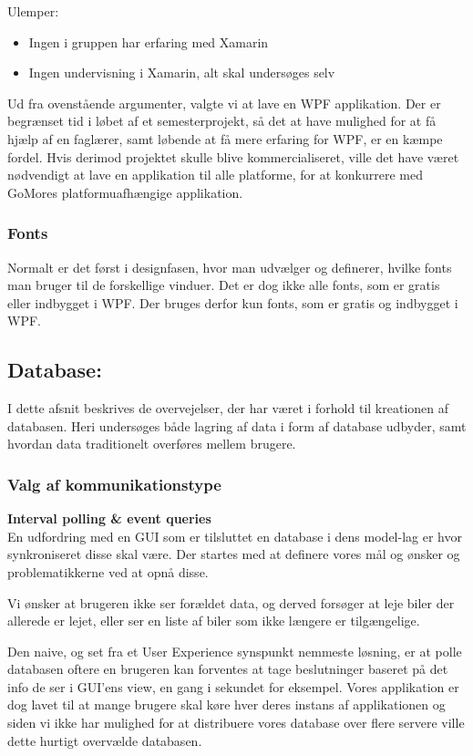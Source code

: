\documentclass[a4paper,12pt,fleqn,oneside]{article}
\begin{document}
Ulemper: \\
\begin{itemize}
    \item Ingen i gruppen har erfaring med Xamarin 
    \item Ingen undervisning i Xamarin, alt skal undersøges selv
\end{itemize}
Ud fra ovenstående argumenter, valgte vi at lave en WPF applikation. Der er begrænset tid i løbet af et semesterprojekt, så det at have mulighed for at få hjælp af en faglærer, samt løbende at få mere erfaring for WPF, er en kæmpe fordel. Hvis derimod projektet skulle blive kommercialiseret, ville det have været nødvendigt at lave en applikation til alle platforme, for at konkurrere med GoMores platformuafhængige applikation. 

\subsubsection{Fonts}
Normalt er det først i designfasen, hvor man udvælger og definerer, hvilke fonts man bruger til de forskellige vinduer. Det er dog ikke alle fonts, som er gratis eller indbygget i WPF. Der bruges derfor kun fonts, som er gratis og indbygget i WPF. 

\subsection{Database:}
I dette afsnit beskrives de overvejelser, der har været i forhold til kreationen af databasen. Heri undersøges både lagring af data i form af database udbyder, samt hvordan data traditionelt overføres mellem brugere. 
\subsubsection{Valg af kommunikationstype}
\textbf{Interval polling \& event queries}\\
En udfordring med en GUI som er tilsluttet en database i dens model-lag er hvor synkroniseret disse skal være. Der startes med at definere vores mål og ønsker og problematikkerne ved at opnå disse. \newline

Vi ønsker at brugeren ikke ser forældet data, og derved forsøger at leje biler der allerede er lejet, eller ser en liste af biler som ikke længere er tilgængelige.\newline

Den naive, og set fra et User Experience synspunkt nemmeste løsning, er at polle databasen oftere en brugeren kan forventes at tage beslutninger baseret på det info de ser i GUI'ens view, en gang i sekundet for eksempel. Vores applikation er dog lavet til at mange brugere skal køre hver deres instans af applikationen og siden vi ikke har mulighed for at distribuere vores database over flere servere ville dette hurtigt overvælde databasen.\newline
\end{document}
